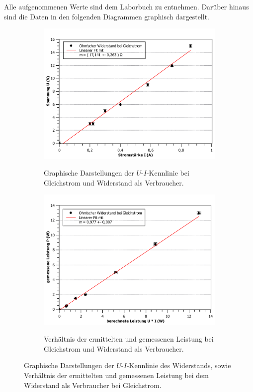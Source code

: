 Alle aufgenommenen Werte sind dem Laborbuch zu entnehmen. 
Darüber hinaus sind die Daten in den folgenden Diagrammen graphisch dargestellt.
\begin{figure}[ht]
	\centering	
	\begin{subfigure}{0.70\textwidth}
		\centering
		\includegraphics[width=\textwidth]{auswertung/widerstand_gleichstrom_Widerstand.pdf}
		\label{fig:1}
		\caption{Graphische Darstellungen der $U$-$I$-Kennlinie bei Gleichstrom und Widerstand als Verbraucher.}	
	\end{subfigure}
	\begin{subfigure}{0.70\textwidth}
		\centering
		\includegraphics[width=\textwidth]{auswertung/widerstand_gleichstrom_Leistung.pdf}
		\label{fig:2}
		\caption{Verhältnis der ermittelten und gemessenen Leistung bei Gleichstrom und Widerstand als Verbraucher.}	
	\end{subfigure}
	\caption{Graphische Darstellungen der $U$-$I$-Kennlinie des Widerstands, sowie Verhältnis der ermittelten und gemessenen Leistung bei dem Widerstand als Verbraucher bei Gleichstrom.}
\end{figure}
